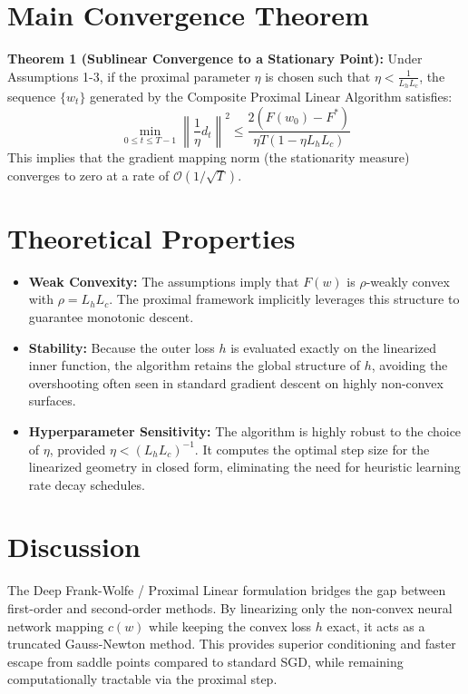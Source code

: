 \documentclass[11pt]{article}
\begin{document}
\section*{Main Convergence Theorem}
\textbf{Theorem 1 (Sublinear Convergence to a Stationary Point):} 
Under Assumptions 1-3, if the proximal parameter $\eta$ is chosen such that $\eta < \frac{1}{L_h L_c}$, the sequence $\{w_t\}$ generated by the Composite Proximal Linear Algorithm satisfies:
\begin{equation}
    \min_{0 \leq t \leq T-1} \left\| \frac{1}{\eta} d_t \right\|^2 \leq \frac{2(F(w_0) - F^*)}{\eta T (1 - \eta L_h L_c)}
\end{equation}
This implies that the gradient mapping norm (the stationarity measure) converges to zero at a rate of $\mathcal{O}(1/\sqrt{T})$.

\section*{Theoretical Properties}
\begin{itemize}
    \item \textbf{Weak Convexity:} The assumptions imply that $F(w)$ is $\rho$-weakly convex with $\rho = L_h L_c$. The proximal framework implicitly leverages this structure to guarantee monotonic descent.
    \item \textbf{Stability:} Because the outer loss $h$ is evaluated exactly on the linearized inner function, the algorithm retains the global structure of $h$, avoiding the overshooting often seen in standard gradient descent on highly non-convex surfaces.
    \item \textbf{Hyperparameter Sensitivity:} The algorithm is highly robust to the choice of $\eta$, provided $\eta < (L_h L_c)^{-1}$. It computes the optimal step size for the linearized geometry in closed form, eliminating the need for heuristic learning rate decay schedules.
\end{itemize}

\section*{Discussion}
The Deep Frank-Wolfe / Proximal Linear formulation bridges the gap between first-order and second-order methods. By linearizing only the non-convex neural network mapping $c(w)$ while keeping the convex loss $h$ exact, it acts as a truncated Gauss-Newton method. This provides superior conditioning and faster escape from saddle points compared to standard SGD, while remaining computationally tractable via the proximal step.
\end{document}
